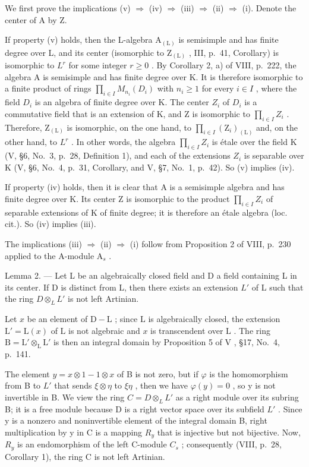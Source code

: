 We first prove the implications (v) \(\Rightarrow\) (iv) \(\Rightarrow\) (iii) \(\Rightarrow\) (ii) \(\Rightarrow\) (i). Denote the center of A by Z.

If property (v) holds, then the L-algebra \(\mathrm{A}_{(\mathrm{L})}\) is semisimple and has finite degree over L, and its center (isomorphic to \(\mathrm{Z}_{(\mathrm{L})}\) , III, p.~41, Corollary) is isomorphic to \(L^{r}\) for some integer \(r \geqslant 0\) . By Corollary 2, a) of VIII, p.~222, the algebra A is semisimple and has finite degree over K. It is therefore isomorphic to a finite product of rings \(\prod_{i \in I} M_{n_{i}}(D_{i})\) with \(n_{i} \geqslant 1\) for every \(i \in I\) , where the field \(D_{i}\) is an algebra of finite degree over K. The center \(Z_{i}\) of \(D_{i}\) is a commutative field that is an extension of K, and Z is isomorphic to \(\prod_{i \in I} Z_{i}\) . Therefore, \(\mathrm{Z}_{(\mathrm{L})}\) is isomorphic, on the one hand, to \(\prod_{i \in I} (\mathrm{Z}_{i})_{(\mathrm{L})}\) and, on the other hand, to \(L^{r}\) . In other words, the algebra \(\prod_{i \in I} Z_{i}\) is étale over the field K (V, §6, No.~3, p.~28, Definition 1), and each of the extensions \(Z_{i}\) is separable over K (V, §6, No.~4, p.~31, Corollary, and V, §7, No.~1, p.~42). So (v) implies (iv).

If property (iv) holds, then it is clear that A is a semisimple algebra and has finite degree over K. Its center Z is isomorphic to the product \(\prod_{i\in I}Z_{i}\) of separable extensions of K of finite degree; it is therefore an étale algebra (loc. cit.). So (iv) implies (iii).

The implications (iii) \(\Rightarrow\) (ii) \(\Rightarrow\) (i) follow from Proposition 2 of VIII, p.~230 applied to the A-module \(\mathrm{A}_s\) .

Lemma 2. --- Let L be an algebraically closed field and D a field containing L in its center. If D is distinct from L, then there exists an extension \(L'\) of L such that the ring \(D \otimes_{L} L'\) is not left Artinian.

Let \(x\) be an element of \(\mathrm{D} - \mathrm{L}\) ; since \(\mathrm{L}\) is algebraically closed, the extension \(\mathrm{L}' = \mathrm{L}(x)\) of \(\mathrm{L}\) is not algebraic and \(x\) is transcendent over \(\mathrm{L}\) . The ring \(\mathrm{B} = \mathrm{L}' \otimes_{\mathrm{L}} \mathrm{L}'\) is then an integral domain by Proposition 5 of \(\mathrm{V}\) , §17, No.~4, p.~141.

The element \(y = x \otimes 1 - 1 \otimes x\) of B is not zero, but if \(\varphi\) is the homomorphism from B to \(L'\) that sends \(\xi \otimes \eta\) to \(\xi \eta\) , then we have \(\varphi(y) = 0\) , so y is not invertible in B. We view the ring \(C = D \otimes_{L} L'\) as a right module over its subring B; it is a free module because D is a right vector space over its subfield \(L'\) . Since y is a nonzero and noninvertible element of the integral domain B, right multiplication by y in C is a mapping \(R_y\) that is injective but not bijective. Now, \(R_y\) is an endomorphism of the left C-module \(C_s\) ; consequently (VIII, p.~28, Corollary 1), the ring C is not left Artinian.

